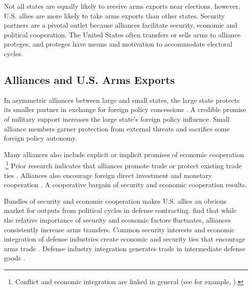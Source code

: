 \documentclass[12pt]{article}
\begin{document}
Not all states are equally likely to receive arms exports near elections, however. 
U.S. allies are more likely to take arms exports than other states. 
Security partners are a pivotal outlet because alliances facilitate security, economic and political cooperation.
The United States often transfers or sells arms to alliance proteges, and proteges have means and motivation to accommodate electoral cycles. 



\subsection{Alliances and U.S. Arms Exports}


In asymmetric alliances between large and small states, the large state protects its smaller partner in exchange for foreign policy concessions \citep{Morrow1991}.
A credible promise of military support increases the large state's foreign policy influence. 
Small alliance members garner protection from external threats and sacrifice some foreign policy autonomy. 


Many alliances also include explicit or implicit promises of economic cooperation \citep{GowaMansfield2004, LongLeeds2006, Davis2008, Poast2012}.\footnote{Conflict and economic integration are linked in general (see for example, \citep{GartzkeLi2003, Chen2021}).}
Prior research indicates that alliances promote trade \citep{Gowa1995, GowaMansfield2004, Haim2016} or protect existing trade ties \citep{Fordham2010}.
Alliances also encourage foreign direct investment \citep{LiVashchilko2010} and monetary cooperation \citep{Li2003}.
A cooperative bargain of security and economic cooperation results. 


Bundles of security and economic cooperation makes U.S. allies an obvious market for outputs from political cycles in defense contracting.
\citet{Thurneretal2019} find that while the relative importance of security and economic factors fluctuates, alliances consistently increase arms transfers.
Common security interests and economic integration of defense industries create economic and security ties that encourage arms trade \citep{Bitzinger1994}. 
Defense industry integration generates trade in intermediate defense goods \citep{Brooks2005}. 
\end{document}

